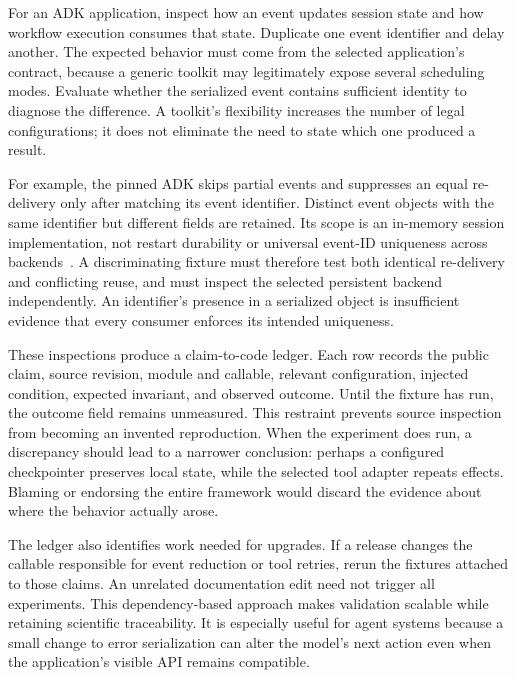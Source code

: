 For an ADK application, inspect how an event updates session state and how workflow execution consumes that state. Duplicate one event identifier and delay another. The expected behavior must come from the selected application's contract, because a generic toolkit may legitimately expose several scheduling modes. Evaluate whether the serialized event contains sufficient identity to diagnose the difference. A toolkit's flexibility increases the number of legal configurations; it does not eliminate the need to state which one produced a result.

For example, the pinned ADK  skips partial events and suppresses an equal re-delivery only after matching its event identifier. Distinct event objects with the same identifier but different fields are retained. Its scope is an in-memory session implementation, not restart durability or universal event-ID uniqueness across backends~\cite{cumb2026adksession}. A discriminating fixture must therefore test both identical re-delivery and conflicting reuse, and must inspect the selected persistent backend independently. An identifier's presence in a serialized object is insufficient evidence that every consumer enforces its intended uniqueness.

These inspections produce a claim-to-code ledger. Each row records the public claim, source revision, module and callable, relevant configuration, injected condition, expected invariant, and observed outcome. Until the fixture has run, the outcome field remains unmeasured. This restraint prevents source inspection from becoming an invented reproduction. When the experiment does run, a discrepancy should lead to a narrower conclusion: perhaps a configured checkpointer preserves local state, while the selected tool adapter repeats effects. Blaming or endorsing the entire framework would discard the evidence about where the behavior actually arose.

The ledger also identifies work needed for upgrades. If a release changes the callable responsible for event reduction or tool retries, rerun the fixtures attached to those claims. An unrelated documentation edit need not trigger all experiments. This dependency-based approach makes validation scalable while retaining scientific traceability. It is especially useful for agent systems because a small change to error serialization can alter the model's next action even when the application's visible API remains compatible.
